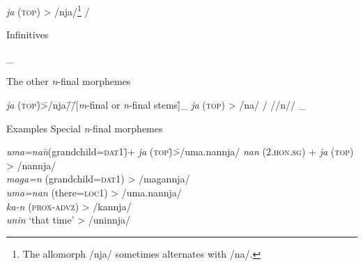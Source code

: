 \begin{exe}
\begin{xlist}
\begin{tabbing}
    \textit{ja} (\textsc{top}) \> > \> /nja/\footnote{The allomorph /nja/ sometimes alternates with /na/.} \> / \>  \parbox[t]{\widthof{[\textit{m}{}-final or \textit{n}{}-final stems]}}{Infinitives\\} \>   \_\\
    \end{tabbing}     
    \ex  The other \textit{n}{}-final morphemes 
    \begin{tabbing}
    \textit{ja} (\textsc{top})\hspace{\tabcolsep}\=\hspace{\tabcolsep}>\hspace{\tabcolsep}\=\hspace{\tabcolsep}/nja/\hspace{\tabcolsep}\=\hspace{\tabcolsep}/\hspace{\tabcolsep}\=\hspace{\tabcolsep}[\textit{m}{}-final or \textit{n}{}-final stems]\hspace{\tabcolsep}\=\hspace{\tabcolsep}\_\kill
    \textit{ja} (\textsc{top}) \> > \> /na/ \> /  \>  //n// \> \_    \\
    \end{tabbing}
   \end{xlist}
\end{exe}
\ea Examples\label{ex:10.4}
  \ea Special \textit{n}-final morphemes
    \begin{tabbing}
    \textit{uma=nan}\hspace{\tabcolsep}\=\hspace{\tabcolsep}(grandchild=\textsc{dat}1)\hspace{\tabcolsep}\=\hspace{\tabcolsep}+  \textit{ja} (\textsc{top})\hspace{\tabcolsep}\=\hspace{\tabcolsep}>\hspace{\tabcolsep}\=\hspace{\tabcolsep}/uma.nannja/\kill
    \textit{nan}     \>  (2.\textsc{hon}.\textsc{sg})         \> +  \textit{ja} (\textsc{top}) \> > \> /nannja/    \\
    \textit{maga=n}  \>  (grandchild=\textsc{dat}1)  \>                      \> > \> /magannja/  \\
    \textit{uma=nan} \>  (there=\textsc{loc}1)       \>                      \> > \> /uma.nannja/\\
    \textit{ka-n}    \>  (\textsc{prox}-\textsc{advz})        \>                      \> > \> /kannja/    \\
    \textit{unin}    \>   ‘that time’       \>                      \> > \> /uninnja/   \\
    \end{tabbing}

